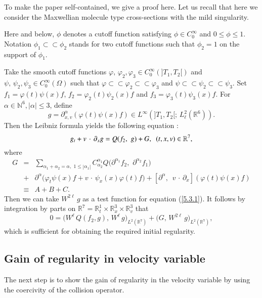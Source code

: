 \documentclass{amsart}[12pt, article]
\begin{document}
To make the paper self-contained, we give a proof here.   Let us recall that
 here we consider the Maxwellian molecule type cross-sections with the mild singularity.

Here and below,  $\phi$ denotes a cutoff  function satisfying
$\phi\in C^\infty_0$ and $0\leq \phi\leq 1$. Notation
$\phi_1\subset\subset\phi_2$ stands for two cutoff functions such
that $\phi_2=1$ on the support of $\phi_1$.

Take the smooth cutoff functions $\varphi,\, \varphi_2, \varphi_3\in
C^\infty_0(]T_1, T_2[)$ and $ \psi,\, \psi_2, \psi_3\in
C^\infty_0(\Omega)$  such that $\varphi\subset\subset
\varphi_2\subset\subset \varphi_3$ and
$\psi\subset\subset\psi_2\subset\subset\psi_3$. Set
$f_1=\varphi(t)\psi(x) f$, $f_2=\varphi_2(t) \psi_2(x) f$ and
$f_3=\varphi_3(t) \psi_3(x) f$. For $\alpha\in{{\mathbb N}}^6, |\alpha|\leq
3$, define
$$
g=\partial^\alpha_{x, v} (\varphi(t)\psi(x) f)\in L^\infty(]T_1,
T_2[;\, L^2_\ell ({{{\mathbb R}}}^6)).
$$
Then the Leibniz formula  yields the following equation :
\begin{equation}\label{5.3.1}
 g_t + v\,\cdot\,\partial_x {g } = Q(f_2,\,\, g)+ G,
\enskip (t, x, v) \in {{{\mathbb R}}}^7,
\end{equation}
where
\begin{eqnarray}\label{5.3.2}
G&=&\sum_{\alpha_1+\alpha_2=\alpha,\,\, 1\leq
|\alpha_1|}C^{\alpha_1}_{\alpha_2} Q\Big(\partial^{\alpha_1}
{f_2},\,\,
\partial^{\alpha_2} f_1\Big)\\
&+&\partial^\alpha\Big( \varphi_t \psi(x) f+ v\,\cdot\,\psi_x(x)
\varphi(t) f\Big) +[\partial^\alpha,\,\,\,
v\,\cdot\,\partial_x](\varphi(t)\psi(x) f)\nonumber \\
&\equiv & A+B+C.\nonumber
\end{eqnarray}
Then we can take $W^{2\ell}\,g $ as a test function for equation (\ref{5.3.1}). It follows by integration by parts on
${{{\mathbb R}}}^7={{{\mathbb R}}}^1_t\times {{{\mathbb R}}}^3_x\times{{{\mathbb R}}}^3_v$ that
\begin{equation*}\label{5.3.3}
0=\Big(W^{\ell}\,Q({f_2},  g),\, W^{\ell}\,g\Big)_{L^2({{{\mathbb R}}}^7)}+
\Big(G,\, W^{2\ell}\,g \Big)_{L^2({{{\mathbb R}}}^7)},
\end{equation*}
which is sufficient for obtaining the required initial regularity.

\subsection{Gain of regularity in velocity variable}\label{section6.2}
\setcounter{equation}{0}
The next step is to show the gain of regularity in the velocity variable
by using the coercivity of the collision operator.
\end{document}
